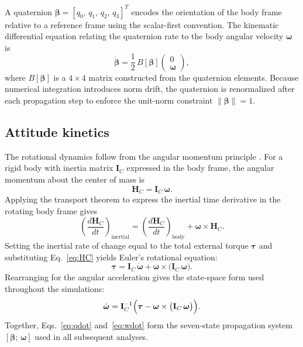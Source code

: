 \documentclass[conf]{new-aiaa}
\begin{document}
A quaternion $\boldsymbol{\beta} = [q_0,\, q_1,\, q_2,\, q_3]^T$ encodes the orientation of the body frame relative to a reference frame using the scalar-first convention. The kinematic differential equation relating the quaternion rate to the body angular velocity $\boldsymbol{\omega}$ is
\begin{equation} \label{eq:qdot}
    \dot{\boldsymbol{\beta}} = \frac{1}{2}\,B[\boldsymbol{\beta}]
    \begin{pmatrix} 0 \\ \boldsymbol{\omega} \end{pmatrix},
\end{equation}
where $B[\boldsymbol{\beta}]$ is a $4\times4$ matrix constructed from the quaternion elements. Because numerical integration introduces norm drift, the quaternion is renormalized after each propagation step to enforce the unit-norm constraint $\|\boldsymbol{\beta}\| = 1$.

\subsection{Attitude kinetics} \label{subsec:attitude_kinetics}

The rotational dynamics follow from the angular momentum principle \cite{kumar_eulerianmechanics}. For a rigid body with inertia matrix $\mathbf{I}_C$ expressed in the body frame, the angular momentum about the center of mass is
\begin{equation} \label{eq:HC}
    \boldsymbol{H}_C = \mathbf{I}_C \,\boldsymbol{\omega}.
\end{equation}
Applying the transport theorem to express the inertial time derivative in the rotating body frame gives
\begin{equation} \label{eq:transport}
    \left(\frac{d\boldsymbol{H}_C}{dt}\right)_{\!\text{inertial}}
    = \left(\frac{d\boldsymbol{H}_C}{dt}\right)_{\!\text{body}}
    + \boldsymbol{\omega} \times \boldsymbol{H}_C.
\end{equation}
Setting the inertial rate of change equal to the total external torque $\boldsymbol{\tau}$ and substituting Eq.~\eqref{eq:HC} yields Euler's rotational equation:
\begin{equation} \label{eq:euler}
    \boldsymbol{\tau} = \mathbf{I}_C \,\dot{\boldsymbol{\omega}}
    + \boldsymbol{\omega} \times \bigl(\mathbf{I}_C \,\boldsymbol{\omega}\bigr).
\end{equation}
Rearranging for the angular acceleration gives the state-space form used throughout the simulations:
\begin{equation} \label{eq:wdot}
    \dot{\boldsymbol{\omega}} = \mathbf{I}_C^{-1}
    \Bigl(\boldsymbol{\tau}
    - \boldsymbol{\omega} \times \bigl(\mathbf{I}_C\,\boldsymbol{\omega}\bigr)\Bigr).
\end{equation}
Together, Eqs.~\eqref{eq:qdot} and~\eqref{eq:wdot} form the seven-state propagation system $[\boldsymbol{\beta};\,\boldsymbol{\omega}]$ used in all subsequent analyses.
\end{document}

